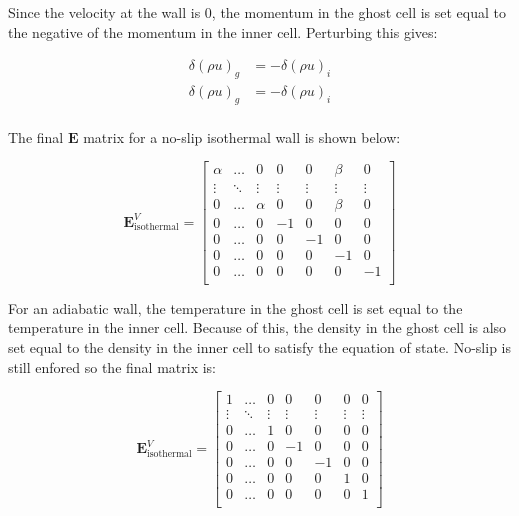\documentclass[10pt]{article}
\begin{document}
\begin{flushleft}
Since the velocity at the wall is 0, the momentum in the ghost cell is set equal to the negative of the momentum in the inner cell. Perturbing this gives:

\begin{align*}
    \delta (\rho u)_g &= -\delta (\rho u)_i \\
    \delta (\rho u)_g &= -\delta (\rho u)_i \\
\end{align*}

The final $\boldsymbol{E}$ matrix for a no-slip isothermal wall is shown below:

\begin{equation*}
    \boldsymbol{E}_\text{isothermal}^V = \begin{bmatrix}
        \alpha & \dots & 0 & 0 & 0 & \beta & 0 \\
        \vdots & \ddots & \vdots & \vdots & \vdots & \vdots & \vdots \\
        0 & \dots & \alpha & 0 & 0 & \beta & 0 \\
        0 & \dots & 0 & -1 & 0 & 0 & 0 \\
        0 & \dots & 0 & 0 & -1 & 0 & 0 \\
        0 & \dots & 0 & 0 & 0 & -1 & 0 \\
        0 & \dots & 0 & 0 & 0 & 0 & -1 \\
    \end{bmatrix}
\end{equation*}

For an adiabatic wall, the temperature in the ghost cell is set equal to the temperature in the inner cell. Because of this, the density in the ghost cell is also set equal to the density in the inner cell to satisfy the equation of state. No-slip is still enfored so the final matrix is:

\begin{equation*}
    \boldsymbol{E}_\text{isothermal}^V = \begin{bmatrix}
        1 & \dots & 0 & 0 & 0 & 0 & 0 \\
        \vdots & \ddots & \vdots & \vdots & \vdots & \vdots & \vdots \\
        0 & \dots & 1 & 0 & 0 & 0 & 0 \\
        0 & \dots & 0 & -1 & 0 & 0 & 0 \\
        0 & \dots & 0 & 0 & -1 & 0 & 0 \\
        0 & \dots & 0 & 0 & 0 & 1 & 0 \\
        0 & \dots & 0 & 0 & 0 & 0 & 1 \\
    \end{bmatrix}
\end{equation*}


\end{flushleft}
\end{document}
